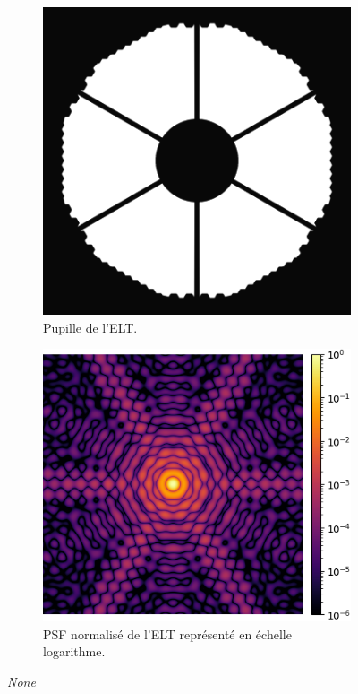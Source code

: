 \begin{figure}[htbp]
    \centering
    \begin{subfigure}[b]{0.40\textwidth}
        \centering
        \includegraphics[width=\textwidth]{figures/ELT_pupil.png}
        \caption{Pupille de l'ELT. }
    \end{subfigure}
    \hfill
    \begin{subfigure}[b]{0.46\textwidth}
        \centering
        \includegraphics[width=\textwidth]{figures/PSF_ELT.png}
        \caption{PSF normalisé de l'ELT représenté en échelle logarithme.}
    \end{subfigure}
    \caption{\textit{None}}
\end{figure}

